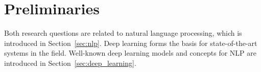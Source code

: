 \clearemptydoublepage

\chapter{Preliminaries}
\label{ch:preliminaries}

Both research questions are related to natural language processing, which is introduced in Section~\ref{sec:nlp}.
Deep learning forms the basis for state-of-the-art systems in the field.
Well-known deep learning models and concepts for NLP are introduced in Section~\ref{sec:deep_learning}.




